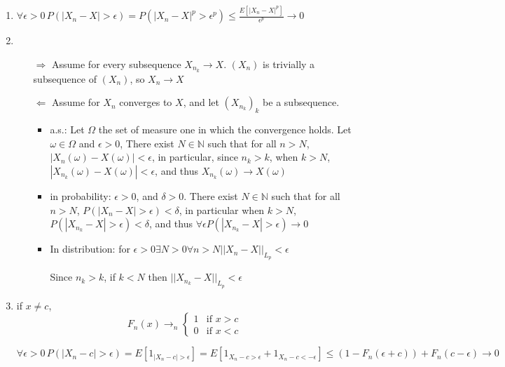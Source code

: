 \documentclass[12pt]{article}
\begin{document}
\begin{enumerate}
\item $\forall \epsilon > 0 \, P(|X_n - X| > \epsilon) =  P(|X_n - X|^p > \epsilon^p)\le \frac{E[ |X_n - X|^p]}{\epsilon^p} \rightarrow 0$
\item
  \begin{itemize}
  \item[$\Rightarrow$] Assume for  every subsequence $X_{n_k} \rightarrow X$. $(X_n)$ is trivially a subsequence of $(X_n)$, so $X_n\rightarrow X$ 
  \item[$\Leftarrow$] Assume for  $X_n$ converges to $X$, and let $(X_{n_k})_k$ be a subsequence.
    \begin{itemize}
    \item a.s.:
      Let $\Omega$ the set of measure one in which the convergence holds.
      Let $\omega \in \Omega$ and $\epsilon > 0$, There exist $N \in \mathbb{N}$  such that for all $n > N$, $|X_n(\omega) - X(\omega)| < \epsilon$, in particular, since $n_k > k$, when
      $k > N$,  $|X_{n_k}(\omega) - X(\omega)| < \epsilon$,
      and thus $X_{n_k}(\omega) \rightarrow X(\omega)$
    \item in probability:
      $\epsilon > 0$, and $\delta > 0$. There exist $N \in \mathbb{N}$  such that for all $n > N$, $P(|X_n - X| > \epsilon) < \delta$, in particular when $k > N$, $P(|X_{n_k} - X| > \epsilon) < \delta$, and thus $\forall \epsilon P(|X_{n_k} - X| > \epsilon) \rightarrow 0$
    \item In distribution:
      for $\epsilon > 0 \exists N > 0 \forall n > N ||X_n - X||_{L_p} < \epsilon$

      Since $n_k > k$, if $k < N$ then $||X_{n_k} - X||_{L_p} < \epsilon$
    \end{itemize}

    
  \end{itemize}
\item
  if $x \ne c$, \[ F_n(x) \rightarrow_n \left\{ \begin{array}{cc}1&\text{if $x > c$}\\0&\text{if $x < c$}\end{array} \right.\]
  
  $\forall \epsilon > 0 \, P(|X_n - c| > \epsilon) = E[1_{|X_n - c| > \epsilon}] = E[1_{X_n - c > \epsilon} + 1_{X_n - c < -\epsilon}] \le (1-F_n(\epsilon+c)) + F_n(c - \epsilon) \rightarrow 0$
\end{enumerate}
\end{document}
